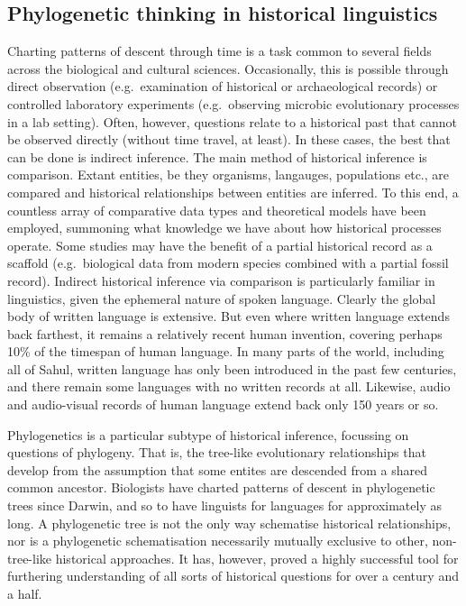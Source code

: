 \hypertarget{phylogenetic-thinking-in-historical-linguistics}{%
\subsection{Phylogenetic thinking in historical linguistics}\label{phylogenetic-thinking-in-historical-linguistics}}

Charting patterns of descent through time is a task common to several fields across the biological and cultural sciences. Occasionally, this is possible through direct observation (e.g.~examination of historical or archaeological records) or controlled laboratory experiments (e.g.~observing microbic evolutionary processes in a lab setting). Often, however, questions relate to a historical past that cannot be observed directly (without time travel, at least). In these cases, the best that can be done is indirect inference. The main method of historical inference is comparison. Extant entities, be they organisms, langauges, populations etc., are compared and historical relationships between entities are inferred. To this end, a countless array of comparative data types and theoretical models have been employed, summoning what knowledge we have about how historical processes operate. Some studies may have the benefit of a partial historical record as a scaffold (e.g.~biological data from modern species combined with a partial fossil record). Indirect historical inference via comparison is particularly familiar in linguistics, given the ephemeral nature of spoken language. Clearly the global body of written language is extensive. But even where written language extends back farthest, it remains a relatively recent human invention, covering perhaps 10\% of the timespan of human language. In many parts of the world, including all of Sahul, written language has only been introduced in the past few centuries, and there remain some languages with no written records at all. Likewise, audio and audio-visual records of human language extend back only 150 years or so.

Phylogenetics is a particular subtype of historical inference, focussing on questions of phylogeny. That is, the tree-like evolutionary relationships that develop from the assumption that some entites are descended from a shared common ancestor. Biologists have charted patterns of descent in phylogenetic trees since Darwin, and so to have linguists for languages for approximately as long. A phylogenetic tree is not the only way schematise historical relationships, nor is a phylogenetic schematisation necessarily mutually exclusive to other, non-tree-like historical approaches. It has, however, proved a highly successful tool for furthering understanding of all sorts of historical questions for over a century and a half.

